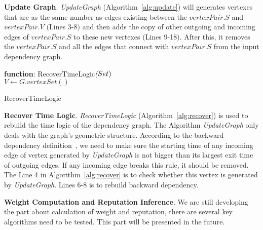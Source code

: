 \textbf{Update Graph}.
\emph{UpdateGraph} (Algorithm~\ref{alg:update}) will generates vertexes that are as the same number as edges existing between the $vertexPair.S$ and $vertexPair.V$ $($Lines 3-8$)$ and then adds the copy of other outgoing and incoming edges of $vertexPair.S$ to these new vertexes $($Lines 9-18$)$. After this, it removes the $vertexPair.S$ and all the edges that connect with $vertexPair.S$ from the input dependency graph.

\begin{algorithm}
	
	\textbf{function}: RecoverTimeLogic$\textit(Set)$\\
	$V \leftarrow G.vertexSet()$\;
	\caption{RecoverTimeLogic}
	\label{alg:recover} 	
\end{algorithm}


\textbf{Recover Time Logic}.
 \emph{RecoverTimeLogic} (Algorithm~\ref{alg:recover}) is used to rebuild the time logic of the dependency graph. The Algorithm \emph{UpdateGraph} only deals with the graph's geometric structure. According to the backward dependency definition~\cite{backtracking,backtrackingfile,backtracking2}, we need to make sure the starting time of any incoming edge of vertex generated by \emph{UpdateGraph} is not bigger than its largest exit time of outgoing edges. If any incoming edge breaks this rule, it should be removed. The Line 4 in Algorithm~\ref{alg:recover} is to check whether this vertex is generated by \emph{UpdateGraph}. Lines 6-8 is to rebuild backward dependency. 
 



\textbf{Weight Computation and Reputation Inference}.
We are still developing the part about calculation of weight and reputation, there are several key algorithms need to be tested. This part will be presented in the future. 
